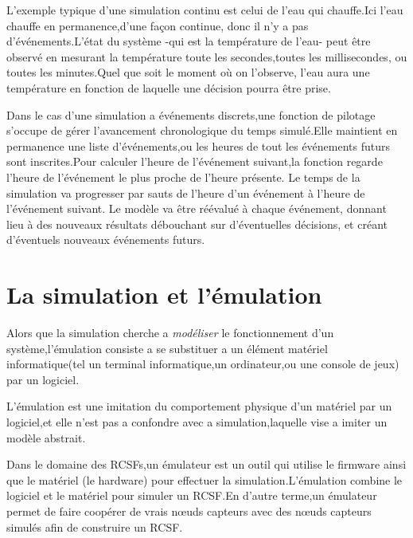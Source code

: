 L'exemple typique d'une simulation continu est celui de l'eau qui chauffe.Ici l'eau chauffe en permanence,d'une façon continue, donc il n'y a pas d'événements.L'état du système -qui est la température de l'eau- peut être observé en mesurant la température toute les secondes,toutes les millisecondes, ou toutes  les minutes.Quel que soit le moment où on l’observe, l’eau aura une température en fonction de laquelle une décision pourra être prise.
  
Dans le cas d'une simulation a événements discrets,une fonction de pilotage s'occupe de gérer l’avancement chronologique du temps simulé.Elle maintient en permanence une liste d'événements,ou les heures de tout les événements futurs sont inscrites.Pour calculer l’heure de l’événement suivant,la fonction regarde l’heure de l’événement le plus proche de l’heure présente. Le temps de la simulation va progresser par sauts de l’heure d’un événement à l’heure de l’événement suivant. Le modèle va être réévalué à chaque événement, donnant lieu à des nouveaux résultats débouchant sur d’éventuelles décisions, et créant d’éventuels nouveaux événements futurs.



\section{La simulation et l'émulation}
Alors que la simulation cherche a \emph{modéliser} le fonctionnement d'un système,l'émulation consiste a se substituer a un élément matériel informatique(tel un terminal informatique,un ordinateur,ou une console de jeux) par un logiciel.

L'émulation est une imitation du comportement physique d'un matériel par un logiciel,et elle n'est pas a confondre avec a simulation,laquelle vise a imiter un modèle abstrait.

Dans le domaine des RCSFs,un émulateur  est un outil qui utilise le firmware ainsi que le matériel (le hardware) pour effectuer la simulation.L'émulation combine le logiciel et le matériel pour simuler un RCSF.En d'autre terme,un émulateur permet de faire coopérer de vrais nœuds capteurs avec des nœuds capteurs simulés afin de construire un RCSF.


